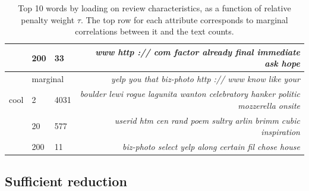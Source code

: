 \documentclass[12pt]{article}
\begin{document}
\begin{table}[b!]
\begin{tabular}{cll|r}
 & 200 & 33 & \footnotesize\it  www http :// com factor already final immediate ask hope \\
\hline
 &  \multicolumn{2}{l|}{marginal}   & \footnotesize\it  yelp you that biz-photo http :// www know like your \\
\small cool & 2 & 4031 & \footnotesize\it  boulder lewi rogue lagunita wanton celebratory hanker politic mozzerella onsite \\
 & 20 & 577 & \footnotesize\it  userid htm cen rand poem sultry arlin brimm cubic inspiration \\
 & 200 & 11 & \footnotesize\it  biz-photo select yelp along certain fil chose house  \\
\hline\end{tabular}
\caption[l]{\label{topwords}
Top 10 words by loading on review characteristics, as a function of relative
penalty weight $\tau$.  The top row for each attribute  corresponds to
marginal correlations between it and the text counts.}
\end{table}


\subsection{Sufficient reduction}
\end{document}
